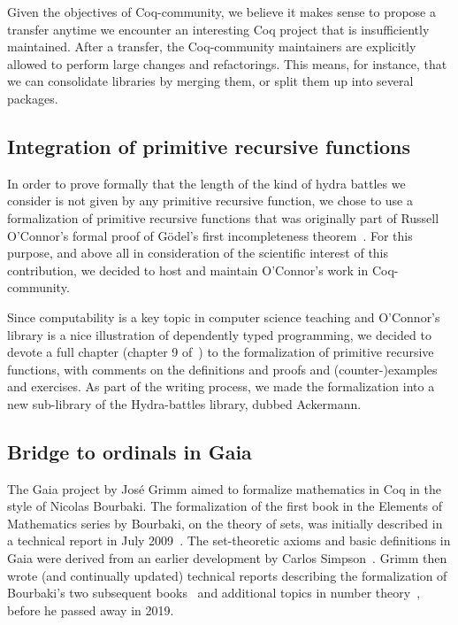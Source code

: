 \documentclass{easychair}
\newcommand{\coq}{Coq\xspace}
\newcommand{\community}{Coq-community\xspace}
\newcommand{\gaia}{Gaia\xspace}
\begin{document}
Given the objectives of \community, we believe it makes sense to propose a transfer anytime we encounter an interesting Coq project that is insufficiently maintained.
%
After a transfer, the \community maintainers are explicitly allowed to perform large changes and refactorings.
%
This means, for instance, that we can consolidate libraries by merging them, or split them up into several packages.

\subsection{Integration of primitive recursive functions}

In order to prove formally that the length of the
kind of hydra battles we consider is not given by any primitive recursive function, we chose to use a formalization of primitive recursive functions that was originally part of Russell O'Connor's formal proof of G\"{o}del's first incompleteness theorem~\cite{OConnor05, Goedel}.
For this purpose, and above all in consideration of the scientific interest of this contribution, we decided to host and maintain O'Connor's work in \community.

Since computability is a key topic in computer science teaching and O'Connor's library is a nice illustration of dependently typed programming, we decided to devote a full chapter (chapter 9 of~\cite{HydraBook}) to the formalization of primitive recursive functions, with comments on the definitions and proofs and (counter-)examples and exercises. As part of the writing process, we made the formalization into a new sub-library of the Hydra-battles library, dubbed Ackermann.

\subsection{Bridge to ordinals in \gaia}

The \gaia project by Jos\'e Grimm aimed to formalize mathematics in \coq in the style of Nicolas Bourbaki. The formalization of the first book in the Elements of Mathematics series by Bourbaki, on the theory of sets, was initially described in a technical report in July 2009~\cite{Grimm2009a}. The set-theoretic axioms and basic definitions in \gaia were derived from an earlier development by Carlos Simpson~\cite{Simpson2004,CatsZFCContrib}. Grimm then wrote (and continually updated) technical reports describing the formalization of Bourbaki's two subsequent books~\cite{Grimm2009b,Grimm2016} and additional topics in number theory~\cite{grimm:hal-00911710,Grimm2014}, before he passed away in 2019.
\end{document}
